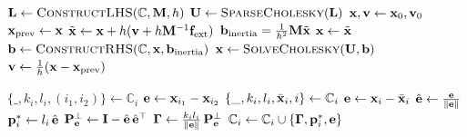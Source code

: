 \begin{algorithm}[H]
\caption{PD mass-spring simulation loop.}
\label{alg:PD_mass_spring_full}
\begin{algorithmic}[1]
\addtolength{\itemsep}{0.5ex}
    \State $\mathbf{L} \gets \textsc{ConstructLHS}(\mathbb{C}, \mathbf{M}, h)$
    \State $\mathbf{U} \gets \textsc{SparseCholesky}(\mathbf{L})$
    \State $\mathbf{x}, \mathbf{v} \gets \mathbf{x}_0, \mathbf{v}_0$
        \State $\mathbf{x}_{\text{prev}} \gets \mathbf{x}$
        \State $\tilde{\mathbf{x}} \gets \mathbf{x} + h(\mathbf{v} + h \mathbf{M}^{-1}\mathbf{f}_{\text{ext}})$
        \State $\mathbf{b}_{\text{inertia}} = \frac{1}{h^2}\mathbf{M}\tilde{\mathbf{x}}$
        \State $\mathbf{x} \gets \tilde{\mathbf{x}}$
            \State $\mathbf{b} \gets \textsc{ConstructRHS}(\mathbb{C}, \mathbf{x}, \mathbf{b}_{\text{inertia}})$
            \State $\mathbf{x} \gets \textsc{SolveCholesky}(\mathbf{U}, \mathbf{b})$
        \EndFor
        \State $\mathbf{v} \gets \frac{1}{h}(\mathbf{x} - \mathbf{x}_{\text{prev}})$ 
    \EndWhile 
\EndFunction
\end{algorithmic}
\end{algorithm}


\begin{algorithm}[H]
\caption{Precompute local Jacobian factors for backward pass.}
\label{alg:PD_mass_spring_precompute_local_derivative}
\begin{algorithmic}[1]
\addtolength{\itemsep}{0.5ex}
            \State $\{\_, k_i, l_i, (i_1, i_2)\} \gets \mathbb{C}_i$
            \State $\mathbf{e} \gets \mathbf{x}_{i_1} - \mathbf{x}_{i_2}$
            \State $\{\_, k_i, l_i, \bar{\mathbf{x}}_i, i\} \gets \mathbb{C}_i$
            \State $\mathbf{e} \gets \mathbf{x}_{i} - \bar{\mathbf{x}}_i$
        \EndIf
        \State $\hat{\mathbf{e}} \gets \frac{\mathbf{e}}{\|\mathbf{e}\|}$
        \State $\mathbf{p}^*_i \gets l_i\,\hat{\mathbf{e}}$
        \State $\mathbf{P}^{\perp}_{\mathbf{e}} \gets \mathbf{I} - \hat{\mathbf{e}}\,\hat{\mathbf{e}}^\top$
        \State $\boldsymbol{\Gamma} \gets \frac{k_i l_i}{\|\mathbf{e}\|}\,\mathbf{P}^{\perp}_{\mathbf{e}}$
        \State $\mathbb{C}_i \gets \mathbb{C}_i \cup \{\boldsymbol{\Gamma}, \mathbf{p}_i^*, \mathbf{e}\}$
    \EndFor
\EndFunction
\end{algorithmic}
\end{algorithm}

